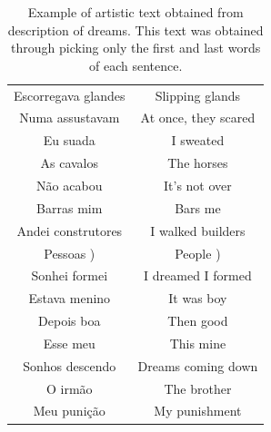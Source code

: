 \documentclass[12pt,fleqn]{article}
\begin{document}
\begin{table}[H] %
	\caption{Example of artistic text obtained from description of dreams.
	This text was obtained through picking only the first and last words of each sentence.}\label{tab:comecoFinal}
\vspace{12pt}
\centering{}
\begin{tabular}{  c | c }
Escorregava glandes              &                                                Slipping glands         \\
Numa assustavam                  &                                                At once, they scared    \\
Eu suada                         &                                                I sweated               \\
As cavalos                       &                                                The horses              \\
Não acabou                       &                                                It's not over           \\
Barras mim                       &                                                Bars me                 \\
Andei construtores               &                                                I walked builders       \\
Pessoas )                        &                                                People  )               \\
Sonhei formei                    &                                                I dreamed I formed      \\
Estava menino                    &                                                It was boy              \\
Depois boa                       &                                                Then good               \\
Esse meu                         &                                                This mine               \\
Sonhos descendo                  &                                                Dreams coming down      \\
O irmão                          &                                                The brother             \\
Meu punição                      &                                                My punishment           \\

\end{tabular}
\end{table}
\end{document}
